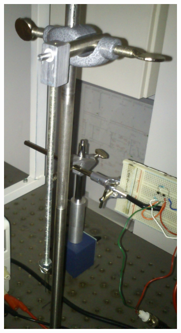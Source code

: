 \begin{figure}[htbp]
\centering
\begin{subfigure}{.3\textwidth}
	\centering
	\includegraphics[width=\textwidth]{img/pendulumNormal}
	\caption{}
	\label{fig:pendulumNormal}
\end{subfigure}
\begin{subfigure}{.3\textwidth}
	\centering

\end{subfigure}
\end{figure}
